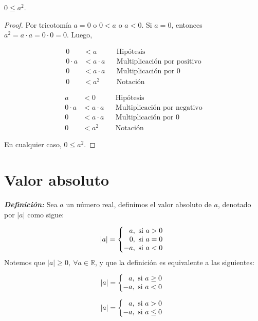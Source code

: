 \documentclass[11pt]{article}
\newcommand{\R}{\mathbb{R}}
\newcommand{\bfit}[1]{\textbf{\textit{#1}}}
\begin{document}
$0\leq a^2$.
 \begin{proof} 
  Por tricotomía $a=0$ o $0<a$ o $a<0$. Si $a=0$, entonces $a^2=a\cdot a =0 \cdot 0 =0$. Luego,
  \begin{center}\vspace{-1em}
   \begin{minipage}[l]{.5\linewidth}
    \begin{align*}
     0 &< a && \text{Hipótesis}\\
     0 \cdot a &< a \cdot a && \text{Multiplicación por positivo}\\
     0 &< a \cdot a && \text{Multiplicación por 0}\\
     0 &< a^2 && \text{Notación}
    \end{align*}
   \end{minipage}%
   \begin{minipage}[r]{.5\linewidth}
    \begin{align*}
     a &< 0 && \text{Hipótesis}\\
     0 \cdot a &< a\cdot a && \text{Multiplicación por negativo}\\
     0 &< a\cdot a && \text{Multiplicación por 0}\\
     0 &< a^2 && \text{Notación}
    \end{align*}
   \end{minipage}
  \end{center} En cualquier caso, $0\leq a^2$.
 \end{proof}

\section*{Valor absoluto}

\bfit{Definición:}  Sea $a$ un número real, definimos el valor absoluto de $a$, denotado por $|a|$ como sigue:

 \[
  |a| = \left\{
 \begin{array}{@{}r@{\thinspace}l}
  a, &  \ \text{si}  \ a>0\\
  0, &  \ \text{si}  \ a=0\\
  -a, & \  \text{si} \  a<0
 \end{array} \right. \]
Notemos que $|a|\geq 0, \ \forall a\in \R$, y que la definición es equivalente a las siguientes:

\begin{center}
\begin{minipage}[c]{.3\linewidth}
 \[|a| = \left\{
  \begin{array}{@{}r@{\thinspace}l}
   a, & \ \text{si} \ a\geq 0\\
   -a, & \ \text{si} \ a<0
  \end{array} \right.\]
 \end{minipage}%
\begin{minipage}[c]{.3\linewidth}
 \[|a| = \left\{
  \begin{array}{@{}r@{\thinspace}l}
   a, & \ \text{si} \ a>0\\
   -a, & \ \text{si} \ a\leq 0
  \end{array} \right.\]
\end{minipage}
\end{center}
\end{document}
